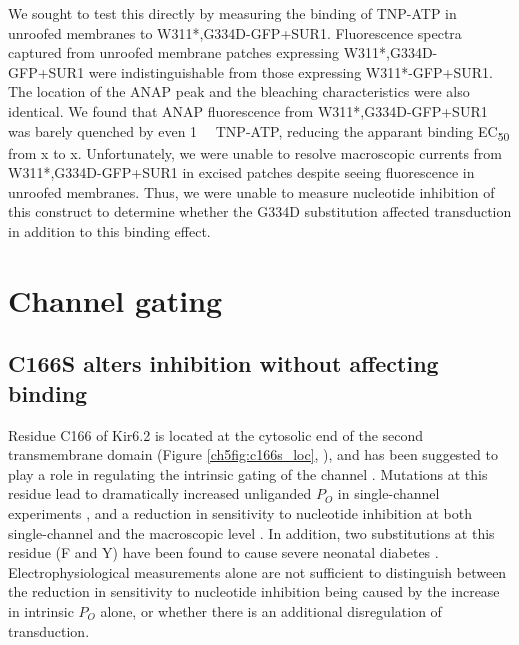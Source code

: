 We sought to test this directly by measuring the binding of TNP-ATP in unroofed membranes to W311*,G334D-GFP+SUR1.
Fluorescence spectra captured from unroofed membrane patches expressing W311*,G334D-GFP+SUR1 were indistinguishable from those expressing W311*-GFP+SUR1.
The location of the ANAP peak and the bleaching characteristics were also identical.
We found that ANAP fluorescence from W311*,G334D-GFP+SUR1 was barely quenched by even \SI{1}{\milli\Molar} TNP-ATP, reducing the apparant binding EC\textsubscript{50} from x to x.
Unfortunately, we were unable to resolve macroscopic currents from W311*,G334D-GFP+SUR1 in excised patches despite seeing fluorescence in unroofed membranes.
Thus, we were unable to measure nucleotide inhibition of this construct to determine whether the G334D substitution affected transduction in addition to this binding effect.

\section{Channel gating}

\subsection{C166S alters inhibition without affecting binding}

Residue C166 of Kir6.2 is located at the cytosolic end of the second transmembrane domain (Figure \ref{ch5fig:c166s_loc}, \cite{lee_molecular_2017, martin_anti-diabetic_2017, li_structure_2017, puljung_cryo-electron_2018-1}), and has been suggested to play a role in regulating the intrinsic gating of the channel \cite{gloyn_kcnj11_2006, trapp_molecular_1998, ribalet_atp-sensitive_2006, yang_palmitoylation_2020, loussouarn_structure_2000, enkvetchakul_kinetic_2000}.
Mutations at this residue lead to dramatically increased unliganded $P_O$ in single-channel experiments \cite{trapp_molecular_1998, enkvetchakul_kinetic_2000, ribalet_atp-sensitive_2006}, and a reduction in sensitivity to nucleotide inhibition at both single-channel and the macroscopic level \cite{trapp_molecular_1998, enkvetchakul_kinetic_2000, ribalet_atp-sensitive_2006, yang_palmitoylation_2020}.
In addition, two substitutions at this residue (F and Y) have been found to cause severe neonatal diabetes \cite{gloyn_kcnj11_2006}.
Electrophysiological measurements alone are not sufficient to distinguish between the reduction in sensitivity to nucleotide inhibition being caused by the increase in intrinsic $P_O$ alone, or whether there is an additional disregulation of transduction.

